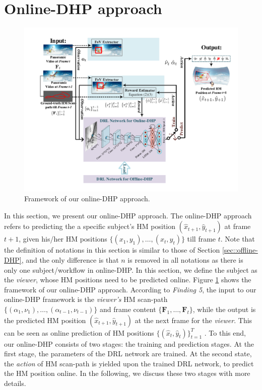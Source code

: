 \documentclass[10pt,journal,compsoc]{IEEEtran}
\begin{document}
\section{Online-DHP approach}

\begin{figure}
	\begin{center}
		\centerline{\includegraphics[width=\columnwidth]{figures/dhp_approach_on_line/whole_framework_online_5}}%
		\caption{\footnotesize{Framework of our online-DHP approach.}}
		\label{online-framework}
	\end{center}
\end{figure}

In this section, we present our online-DHP approach.
The online-DHP approach refers to predicting the a specific subject's HM position $(\hat{x}_{t+1},\hat{y}_{t+1})$ at frame $t+1$, given his/her HM positions $\{(x_{1},y_{1}),\ldots, (x_{t},y_{t})\}$ till frame $t$.
Note that the definition of notations in this section is similar to those of Section \ref{sec::offline-DHP}, and the only difference is that $n$ is removed in all notations as there is only one subject/workflow in online-DHP.
In this section, we define the subject as the \textit{viewer}, whose HM positions need to be predicted online. %
Figure \ref{online-framework} shows the framework of our online-DHP approach. %
According to \textit{Finding 5}, the input to our online-DHP framework is the \textit{viewer's} HM scan-path $\{(\alpha_1,\nu_1),\ldots, (\alpha_{t-1},\nu_{t-1})\}$ and frame content $\{\mathbf{F}_1, \ldots, \mathbf{F}_t \}$, while the output is the predicted HM position $(\hat{x}_{t+1},\hat{y}_{t+1})$ at the next frame for the \textit{viewer}.
This can be seen as online prediction of HM positions $\{(\hat{x}_{t},\hat{y}_{t})\}_{t=1}^{T}$ .
To this end, our online-DHP consists of two stages: the training and prediction stages.
At the first stage, the parameters of the DRL network are trained.
At the second state, the \textit{action} of HM scan-path is yielded upon the trained DRL network, to predict the HM position online.
In the following, we discuss these two stages with more details.
\end{document}
